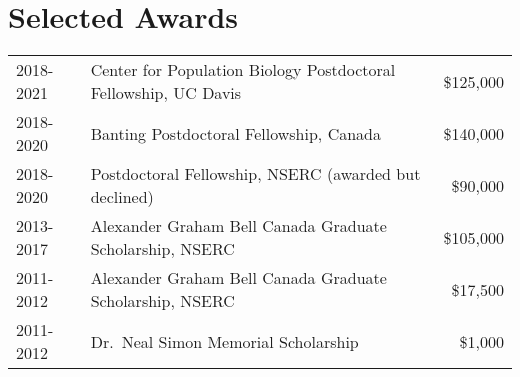 \documentclass[12pt]{article}
\begin{document}
\section*{Selected Awards}

\begin{tabular}{llr}
  2018-2021 & Center for Population Biology Postdoctoral Fellowship, UC Davis & \$125,000 \\
  2018-2020 & Banting Postdoctoral Fellowship, Canada & \$140,000 \\
  2018-2020 & Postdoctoral Fellowship, NSERC (awarded but declined) & \$90,000 \\
  2013-2017 & Alexander Graham Bell Canada Graduate Scholarship, NSERC & \$105,000\\
  2011-2012 & Alexander Graham Bell Canada Graduate Scholarship, NSERC & \$17,500\\
  2011-2012 & Dr.\ Neal Simon Memorial Scholarship & \$1,000\\

\end{tabular}
\end{document}

